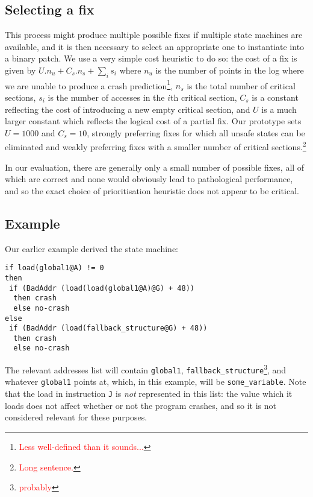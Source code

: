 \documentclass[10pt,twocolumn,preprint,natbib,authoryear]{sigplanconf}
\newcommand{\editorial}[1]{\textcolor{red}{\footnote{\textcolor{red}{#1}}}}
\begin{document}
\subsection{Selecting a fix}
\label{sect:selectfix}

This process might produce multiple possible fixes if multiple state
machines are available, and it is then necessary to select an
appropriate one to instantiate into a binary patch.  We use a very
simple cost heuristic to do so: the cost of a fix is given by $U.n_u +
C_s.n_s + {\sum_{i}}s_i$ where $n_u$ is the number of points in the
log where we are unable to produce a crash prediction\editorial{Less
  well-defined than it sounds...}, $n_s$ is the total number of
critical sections, $s_i$ is the number of accesses in the $i$th
critical section, $C_s$ is a constant reflecting the cost of
introducing a new empty critical section, and $U$ is a much larger
constant which reflects the logical cost of a partial fix.  Our
prototype sets $U=1000$ and $C_s=10$, strongly preferring fixes for
which all unsafe states can be eliminated and weakly preferring fixes
with a smaller number of critical sections.\editorial{Long sentence.}

In our evaluation, there are generally only a small number of possible
fixes, all of which are correct and none would obviously lead to
pathological performance, and so the exact choice of prioritisation
heuristic does not appear to be critical.

\subsection{Example}

Our earlier example derived the state machine:

\begin{verbatim}
if load(global1@A) != 0
then
 if (BadAddr (load(load(global1@A)@G) + 48))
  then crash
  else no-crash
else
 if (BadAddr (load(fallback_structure@G) + 48))
  then crash
  else no-crash
\end{verbatim}

The relevant addresses list will contain \verb|global1|,
\verb|fallback_structure|\editorial{probably}, and whatever
\verb|global1| points at, which, in this example, will be
\verb|some_variable|.  Note that the load in instruction \verb|J| is
\emph{not} represented in this list: the value which it loads does not
affect whether or not the program crashes, and so it is not considered
relevant for these purposes.
\end{document}
